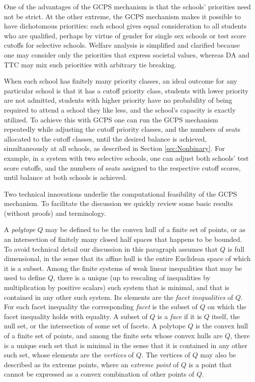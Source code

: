 \documentclass[12pt, A4paper]{article}
\theoremstyle{definition}
\begin{document}
One of the advantages of the GCPS mechanism is that the schools' priorities need not be strict.  At the other extreme, the GCPS mechanism makes it possible to have dichotomous priorities: each school gives equal consideration to all students who are qualified, perhaps by virtue of gender for single sex schools or test score cutoffs for selective schools.  Welfare analysis is simplified and clarified because one may consider only the priorities that express societal values, whereas DA and TTC may mix such priorities with arbitrary tie breaking.

When each school has finitely many priority classes, an ideal outcome for any particular school is that it has a cutoff priority class, students with lower priority are not admitted, students with higher priority have no probability of being required to attend a school they like less, and the school's capacity is exactly utilized.  To achieve this with GCPS one can run the GCPS mechanism repeatedly while adjusting the cutoff priority classes, and the numbers of seats allocated to the cutoff classes, until the desired balance is achieved, simultaneously at all schools, as described in Section \ref{sec:Nonbinary}.  For example, in a system with two selective schools, one can adjust both schools' test score cutoffs, and the numbers of seats assigned to the respective cutoff scores, until balance at both schools is achieved. 

Two technical innovations underlie the computational feasibility of the GCPS mechanism.   To facilitate the discussion we quickly review some basic results (without proofs) and terminology. 

A \emph{polytope} $Q$ may be defined to be the convex hull of a finite set of points, or as an intersection of finitely many closed half spaces that happens to be bounded.  To avoid technical detail our discussion in this paragraph assumes that $Q$ is full dimensional, in the sense that its affine hull is the entire Euclidean space of which it is a subset. Among the finite systems of weak linear inequalities that may be used to define $Q$, there is a unique (up to rescaling of inequalities by multiplication by positive scalars) such system that is minimal, and that is contained in any other such system.  Its elements are the \emph{facet inequalities} of $Q$.  For each facet inequality the corresponding \emph{facet} is the subset of $Q$ on which the facet inequality holds with equality.  A subset of $Q$ is a \emph{face} if it is $Q$ itself, the null set, or the intersection of some set of facets.  A polytope $Q$ is the convex hull of a finite set of points, and among the finite sets whose convex hulls are $Q$, there is a unique such set that is minimal in the sense that it is contained in any other such set, whose elements are the \emph{vertices} of $Q$.  The vertices of $Q$ may also be described as its extreme points, where an \emph{extreme point} of $Q$ is a point that cannot be expressed as a convex combination of other points of $Q$.
\end{document}
